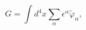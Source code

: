 \begin{equation}
G=\int d^4x \sum_\alpha \epsilon^\alpha
\widetilde{\varphi}_\alpha,
\end{equation}

